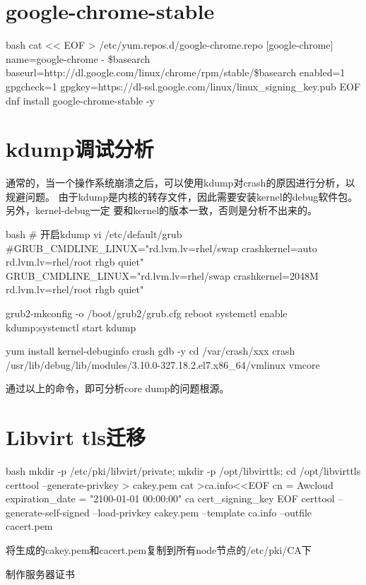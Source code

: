 \section{google-chrome-stable}
\begin{code-block}{bash}
cat << EOF > /etc/yum.repos.d/google-chrome.repo
[google-chrome]
name=google-chrome - \$basearch
baseurl=http://dl.google.com/linux/chrome/rpm/stable/\$basearch
enabled=1
gpgcheck=1
gpgkey=https://dl-ssl.google.com/linux/linux_signing_key.pub
EOF
dnf install google-chrome-stable -y
\end{code-block}

\section{kdump调试分析}
通常的，当一个操作系统崩溃之后，可以使用kdump对crash的原因进行分析，以规避问题。
由于kdump是内核的转存文件，因此需要安装kernel的debug软件包。另外，kernel-debug一定
要和kernel的版本一致，否则是分析不出来的。
\begin{code-block}{bash}
# 开启kdump
vi /etc/default/grub
#GRUB_CMDLINE_LINUX="rd.lvm.lv=rhel/swap crashkernel=auto rd.lvm.lv=rhel/root rhgb quiet"
GRUB_CMDLINE_LINUX="rd.lvm.lv=rhel/swap crashkernel=2048M rd.lvm.lv=rhel/root rhgb quiet"

grub2-mkconfig -o /boot/grub2/grub.cfg
reboot
systemctl enable kdump;systemctl start kdump

yum install kernel-debuginfo crash gdb -y
cd /var/crash/xxx
crash /usr/lib/debug/lib/modules/3.10.0-327.18.2.el7.x86_64/vmlinux vmcore
\end{code-block}

通过以上的命令，即可分析core dump的问题根源。

\section{Libvirt tls迁移}
\begin{code-block}{bash}
mkdir -p /etc/pki/libvirt/private;
mkdir -p /opt/libvirttls;
cd /opt/libvirttls
certtool --generate-privkey > cakey.pem
cat >ca.info<<EOF
cn = Awcloud
expiration_date = "2100-01-01 00:00:00"
ca
cert_signing_key
EOF
certtool --generate-self-signed --load-privkey cakey.pem --template ca.info --outfile cacert.pem
\end{code-block}

将生成的cakey.pem和cacert.pem复制到所有node节点的/etc/pki/CA下

制作服务器证书

